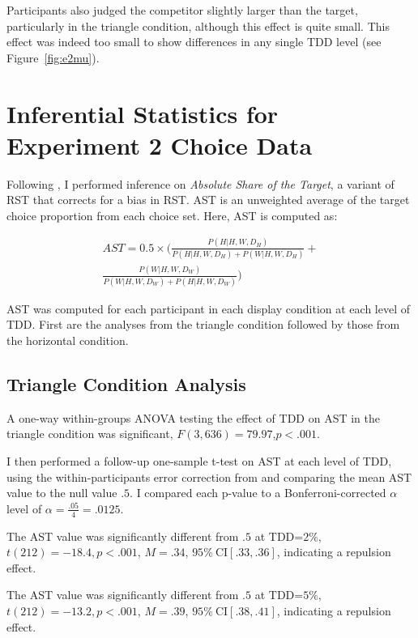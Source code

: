 Participants also judged the competitor slightly larger than the target, particularly in the triangle condition, although this effect is quite small. This effect was indeed too small to show differences in any single TDD level (see Figure~\ref{fig:e2mu}). 

\chapter{Inferential Statistics for Experiment 2 Choice Data}

Following \textcite{katsimpokisRobustBayesianTest2022}, I performed inference on \textit{Absolute Share of the Target}, a variant of RST that corrects for a bias in RST. AST is an unweighted average of the target choice proportion from each choice set. Here, AST is computed as:

\begin{equation}
    \begin{aligned}
        AST=0.5 \times (\frac{P(H|{H,W,D_{H}})}{P(H|{H,W,D_{H}})+P(W|{H,W,D_{H}})}+ \\
        \frac{P(W|{H,W,D_{W}})}{P(W|{H,W,D_{W}})+P(H|{H,W,D_{W}})})
    \end{aligned}
\end{equation}

AST was computed for each participant in each display condition at each level of TDD. First are the analyses from the triangle condition followed by those from the horizontal condition. 

\section{Triangle Condition Analysis}
A one-way within-groups ANOVA testing the effect of TDD on AST in the triangle condition was significant, $\mathit{F}(3,636)=79.97$,$\mathit{p}<.001$. 

I then performed a follow-up one-sample t-test on AST at each level of TDD, using the within-participants error correction from \textcite{cousineau2014error} and comparing the mean AST value to the null value $.5$. I compared each p-value to a Bonferroni-corrected $\alpha$ level of $\alpha=\frac{.05}{4}=.0125$. 

The AST value was significantly different from $.5$ at TDD=$2\%$, $\mathit{t}(212)=-18.4,\textit{p}<.001$, $\mathit{M}=.34$, $95\%\ \mathrm{CI}[.33,.36]$, indicating a repulsion effect. 

The AST value was significantly different from $.5$ at TDD=$5\%$, $\mathit{t}(212)=-13.2,\textit{p}<.001$, $\mathit{M}=.39$, $95\%\ \mathrm{CI}[.38,.41]$, indicating a repulsion effect. 

